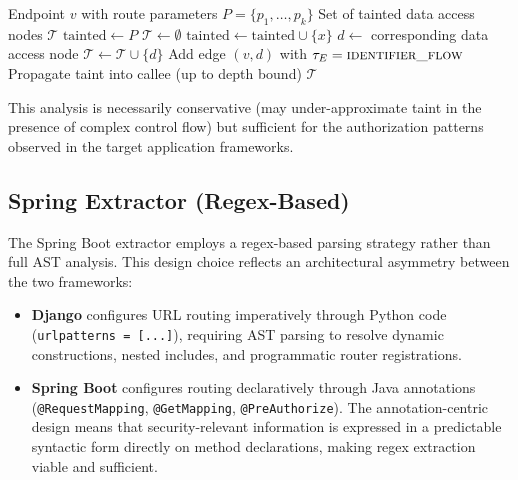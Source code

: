\begin{algorithm}
\caption{Identifier Flow Taint Propagation}
\label{alg:id-flow}
\begin{algorithmic}[1]
\REQUIRE Endpoint $v$ with route parameters $P = \{p_1, \ldots, p_k\}$
\ENSURE Set of tainted data access nodes $\mathcal{T}$
\STATE $\text{tainted} \leftarrow P$ 
\STATE $\mathcal{T} \leftarrow \emptyset$
            \STATE $\text{tainted} \leftarrow \text{tainted} \cup \{x\}$
        \ENDIF
        \STATE $d \leftarrow$ corresponding data access node
        \STATE $\mathcal{T} \leftarrow \mathcal{T} \cup \{d\}$
        \STATE Add edge $(v, d)$ with $\tau_E = \textsc{identifier\_flow}$
        \STATE Propagate taint into callee (up to depth bound)
    \ENDIF
\ENDFOR
\RETURN $\mathcal{T}$
\end{algorithmic}
\end{algorithm}

This analysis is necessarily conservative (may under-approximate taint in the presence of complex control flow) but sufficient for the authorization patterns observed in the target application frameworks.

\subsection{Spring Extractor (Regex-Based)}

The Spring Boot extractor employs a regex-based parsing strategy rather than full AST analysis. This design choice reflects an architectural asymmetry between the two frameworks:

\begin{itemize}
    \item \textbf{Django} configures URL routing imperatively through Python code (\texttt{urlpatterns = [...]}), requiring AST parsing to resolve dynamic constructions, nested includes, and programmatic router registrations.

    \item \textbf{Spring Boot} configures routing declaratively through Java annotations (\texttt{@RequestMapping}, \texttt{@GetMapping}, \texttt{@PreAuthorize}). The annotation-centric design means that security-relevant information is expressed in a predictable syntactic form directly on method declarations, making regex extraction viable and sufficient.
\end{itemize}

